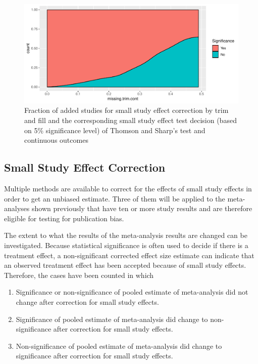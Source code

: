 \documentclass[11pt,a4paper,twoside]{book}\usepackage[]{graphicx}\usepackage[]{color}
\newenvironment{knitrout}{}{} %
\begin{document}
\begin{figure}
\begin{knitrout}
\color{fgcolor}

{\centering \includegraphics[width=\textwidth-3cm]{figure/ch02_figunnamed-chunk-35-1} 

}



\end{knitrout}
\caption{Fraction of added studies for small study effect correction by trim and fill and the corresponding small study effect test decision (based on 5\% significance level) of Thomson and Sharp's test and continuous outcomes}
\label{trimfill.pvalues.cont}
\end{figure}


\subsection{Small Study Effect Correction}
Multiple methods are available to correct for the effects of small study effects in order to get an unbiased estimate. Three of them will be applied to the meta-analyses shown previously that have ten or more study results and are therefore eligible for testing for publication bias. 

\vspace{0mm}
The extent to what the results of the meta-analysis results are changed can be investigated. Because statistical significance is often used to decide if there is a treatment effect, a non-significant corrected effect size estimate can indicate that an observed treatment effect has been accepted because of small study effects. Therefore, the cases have been counted in which 
\begin{enumerate}
\item Significance or non-significance of pooled estimate of meta-analysis did not change after correction for small study effects.
\item Significance of pooled estimate of meta-analysis did change to non-significance after correction for small study effects.
\item Non-significance of pooled estimate of meta-analysis did change to significance after correction for small study effects.
\end{enumerate}
\end{document}
